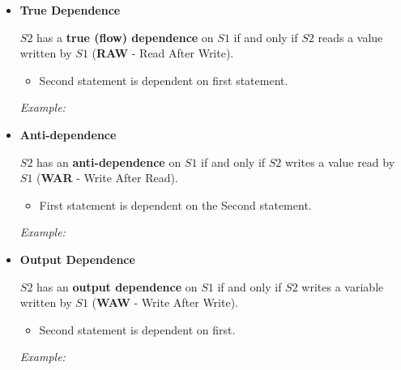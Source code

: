 \begin{itemize}
    \item {\Large \textbf{True Dependence}}
    \par $S2$ has a \textbf{true (flow) dependence} on $S1$ if and only if $S2$ reads a value written by $S1$ (\textbf{RAW} - Read After Write).
    \par
    \begin{minipage}{0.7\textwidth}
        \centering
        \begin{itemize}
            \item Second statement is dependent on first statement.
        \end{itemize}
    \end{minipage}
    \begin{minipage}{0.2\textwidth}
        \textit{Example:}
    \end{minipage}
    \item {\Large \textbf{Anti-dependence}}
    \par $S2$ has an \textbf{anti-dependence} on $S1$ if and only if $S2$ writes a value read by $S1$ (\textbf{WAR} - Write After Read).
    \par
    \begin{minipage}{0.7\textwidth}
        \centering
        \begin{itemize}
            \item First statement is dependent on the Second statement.
        \end{itemize}
    \end{minipage}
    \begin{minipage}{0.2\textwidth}
        \textit{Example:}
    \end{minipage}
    \item {\Large \textbf{Output Dependence}}
    \par $S2$ has an \textbf{output dependence} on $S1$ if and only if $S2$ writes a variable written by $S1$ (\textbf{WAW} - Write After Write).
    \par
    \begin{minipage}{0.7\textwidth}
        \centering
        \begin{itemize}
            \item Second statement is dependent on first.
        \end{itemize}
    \end{minipage}
    \begin{minipage}{0.2\textwidth}
        \textit{Example:}
    \end{minipage}
\end{itemize}
